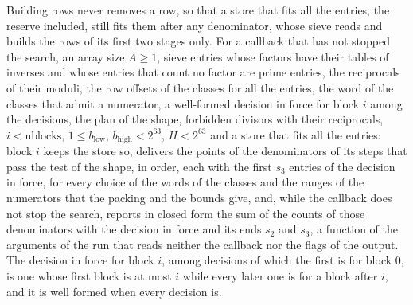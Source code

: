 \begin{lemma}\label{lem:runBlock}
  \leanok
  Building rows never removes a row, so that a store that fits all the entries, the reserve
  included, still fits them after any denominator, whose sieve reads and builds the rows of its
  first two stages only. For a callback that has not stopped the search, an array size $A \ge 1$,
  sieve entries whose factors have their tables of inverses and whose entries that count no factor
  are prime entries, the reciprocals of their moduli, the row offsets of the classes for all the
  entries, the word of the classes that admit a numerator, a well-formed decision in force for block
  $i$ among the decisions, the plan of the shape, forbidden divisors with their reciprocals,
  $i < \mathrm{nblocks}$, $1 \le b_{\mathrm{low}}$, $b_{\mathrm{high}} < 2^{63}$, $H < 2^{63}$ and a
  store that fits all the entries: block $i$ keeps the store so, delivers the points of the
  denominators of its steps that pass the test of the shape, in order, each with the first $s_3$
  entries of the decision in force, for every choice of the words of the classes and the ranges of
  the numerators that the packing and the bounds give, and, while the callback does not stop the
  search, reports in closed form the sum of the counts of those denominators with the decision in
  force and its ends $s_2$ and $s_3$, a function of the arguments of the run that reads neither the
  callback nor the flags of the output. The decision in force for block $i$, among decisions of
  which the first is for block $0$, is one whose first block is at most $i$ while every later one is
  for a block after $i$, and it is well formed when every decision is.
\end{lemma}

